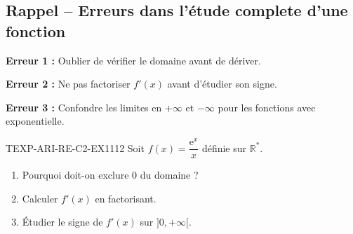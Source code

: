 

\subsection*{Rappel -- Erreurs dans l'étude complete d'une fonction}

\textbf{Erreur 1 :} Oublier de vérifier le domaine avant de dériver.

\textbf{Erreur 2 :} Ne pas factoriser $f'(x)$ avant d'étudier son signe.

\textbf{Erreur 3 :} Confondre les limites en $+\infty$ et $-\infty$ pour les fonctions avec exponentielle.

\begin{exercice}{TEXP-ARI-RE-C2-EX1}{1}{12}
Soit $f(x) = \dfrac{\mathrm{e}^x}{x}$ définie sur $\mathbb{R}^*$.
\begin{enumerate}
  \item Pourquoi doit-on exclure $0$ du domaine ?
  \item Calculer $f'(x)$ en factorisant.
  \item Étudier le signe de $f'(x)$ sur $]0, +\infty[$.
\end{enumerate}
\end{exercice}

